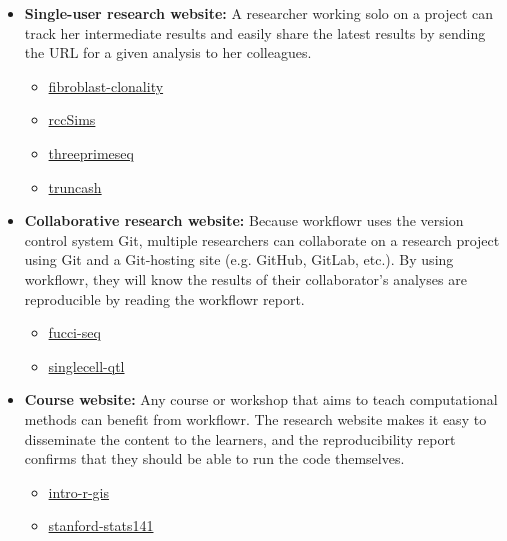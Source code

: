 \documentclass[9pt,a4paper]{extarticle}
\begin{document}
\begin{itemize}

\item \textbf{Single-user research website:} A researcher working solo
on a project can track her intermediate results and easily share the
latest results by sending the URL for a given analysis to her
colleagues.

\begin{itemize}

\item
\href{https://davismcc.github.io/fibroblast-clonality/}{fibroblast-clonality}

\item \href{https://jean997.github.io/rccSims/}{rccSims}

\item
\href{https://brimittleman.github.io/threeprimeseq/}{threeprimeseq}

\item \href{https://lsun.github.io/truncash/}{truncash}

\end{itemize}

\item \textbf{Collaborative research website:} Because workflowr uses
the version control system Git, multiple researchers can collaborate on
a research project using Git and a Git-hosting site (e.g. GitHub,
GitLab, etc.). By using workflowr, they will know the results of their
collaborator’s analyses are reproducible by reading the workflowr
report.

\begin{itemize}

\item \href{https://jdblischak.github.io/fucci-seq/}{fucci-seq}

\item
\href{https://jdblischak.github.io/singlecell-qtl/}{singlecell-qtl}

\end{itemize}

\item \textbf{Course website:} Any course or workshop that aims to teach
computational methods can benefit from workflowr. The research website
makes it easy to disseminate the content to the learners, and the
reproducibility report confirms that they should be able to run the code
themselves.

\begin{itemize}

\item \href{https://annakrystalli.me/intro-r-gis/}{intro-r-gis}

\item
\href{https://xiangzhu.github.io/stanford-stats141/}{stanford-stats141}

\end{itemize}

\end{itemize}
\end{document}
